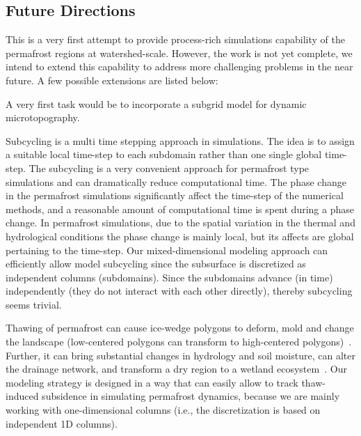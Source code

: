 \documentclass[review]{elsarticle}
\begin{document}
 
\subsection{Future Directions}
This is a very first attempt to provide process-rich simulations capability of the permafrost regions at watershed-scale. However, the work is not yet complete, we intend to  extend this capability to address more challenging problems in the near future. A few possible extensions are listed below:

A very first task would be to incorporate a subgrid model for dynamic microtopography.

Subcycling is a multi time stepping approach in simulations. The idea is to assign a suitable local time-step to each subdomain rather than one single global time-step. The subcycling is a very convenient approach for permafrost type simulations and can dramatically reduce computational time. The phase change in the permafrost simulations significantly affect the time-step of the numerical methods, and a reasonable amount of computational time is spent during a phase change. In permafrost simulations, due to the spatial variation in the thermal and hydrological conditions the phase change is mainly local, but its affects are global pertaining to the time-step. Our mixed-dimensional modeling approach can efficiently allow model subcycling since the subsurface is discretized as independent columns (subdomains). Since the subdomains advance (in time) independently (they do not interact with each other directly), thereby subcycling seems trivial. 

Thawing of permafrost can cause ice-wedge polygons to deform, mold and change the landscape (low-centered polygons can transform to high-centered polygons)~\cite{jorgenson2006abrupt,liljedahl2012ice}. Further, it can bring substantial changes in hydrology and soil moisture, can alter the drainage network, and transform a dry region to a wetland ecosystem~\cite{hinzman2005evidence,rowland2010arctic}. Our modeling strategy is designed in a way that can easily allow to track thaw-induced subsidence in simulating permafrost dynamics, because we are mainly working with one-dimensional columns (i.e., the discretization is based on independent 1D columns).




\end{document}
